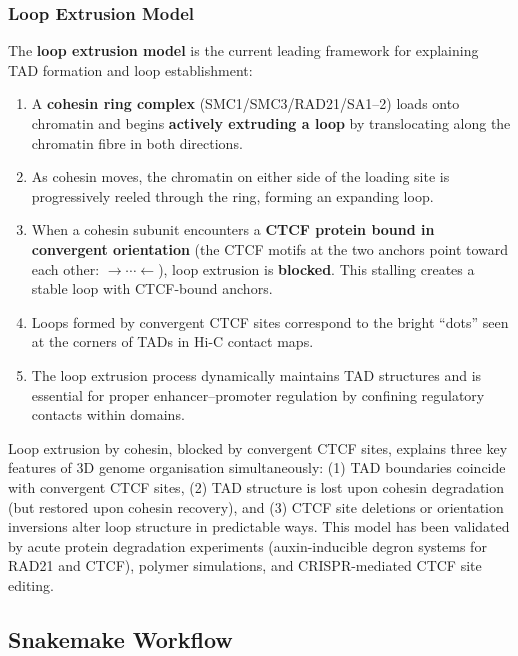 \subsubsection{Loop Extrusion Model}

The \textbf{loop extrusion model} is the current leading framework for explaining TAD formation and loop establishment:

\begin{enumerate}[itemsep=2pt]
  \item A \textbf{cohesin ring complex} (SMC1/SMC3/RAD21/SA1--2) loads onto chromatin and begins \textbf{actively extruding a loop} by translocating along the chromatin fibre in both directions.
  \item As cohesin moves, the chromatin on either side of the loading site is progressively reeled through the ring, forming an expanding loop.
  \item When a cohesin subunit encounters a \textbf{CTCF protein bound in convergent orientation} (the CTCF motifs at the two anchors point toward each other: $\rightarrow \cdots \leftarrow$), loop extrusion is \textbf{blocked}. This stalling creates a stable loop with CTCF-bound anchors.
  \item Loops formed by convergent CTCF sites correspond to the bright ``dots'' seen at the corners of TADs in Hi-C contact maps.
  \item The loop extrusion process dynamically maintains TAD structures and is essential for proper enhancer--promoter regulation by confining regulatory contacts within domains.
\end{enumerate}

\begin{keyconcept}[title={The Loop Extrusion Paradigm}]
Loop extrusion by cohesin, blocked by convergent CTCF sites, explains three key features of 3D genome organisation simultaneously: (1) TAD boundaries coincide with convergent CTCF sites, (2) TAD structure is lost upon cohesin degradation (but restored upon cohesin recovery), and (3) CTCF site deletions or orientation inversions alter loop structure in predictable ways. This model has been validated by acute protein degradation experiments (auxin-inducible degron systems for RAD21 and CTCF), polymer simulations, and CRISPR-mediated CTCF site editing.
\end{keyconcept}

\subsection{Snakemake Workflow}
\label{subsec:3dgenome:snakemake}

